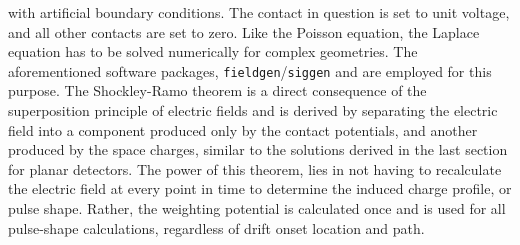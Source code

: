with artificial boundary conditions. The contact in question is set to unit voltage, and all other contacts are set to zero. Like the Poisson equation, the Laplace equation has to be solved numerically for complex geometries. The aforementioned software packages, \texttt{fieldgen}/\texttt{siggen} and \SSD{} are employed for this purpose. The Shockley-Ramo theorem is a direct consequence of the superposition principle of electric fields and is derived by separating the electric field into a component produced only by the contact potentials, and another produced by the space charges, similar to the solutions derived in the last section for planar detectors. The power of this theorem, lies in not having to recalculate the electric field at every point in time to determine the induced charge profile, or pulse shape. Rather, the weighting potential is calculated once and is used for all pulse-shape calculations, regardless of drift onset location and path. 

